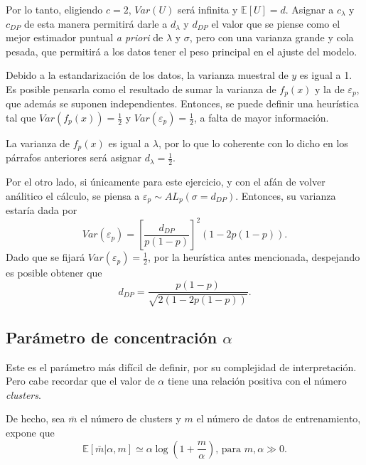 Por lo tanto, eligiendo $c = 2$, $Var(U)$ ser\'a infinita y $\mathbb{E}[U] = d$. Asignar a $c_\lambda$ y $c_{DP}$ de esta manera permitir\'a darle a $d_\lambda$ y $d_{DP}$ el valor que se piense como el mejor estimador puntual \textit{a priori} de $\lambda$ y $\sigma$, pero con una varianza grande y cola pesada, que permitir\'a a los datos tener el peso principal en el ajuste del modelo. 

Debido a la estandarizaci\'on de los datos, la varianza muestral de $y$ es igual a 1. Es posible pensarla como el resultado de sumar la varianza de $f_p(x)$ y la de $\varepsilon_p$, que adem\'as se suponen independientes. Entonces, se puede definir una heur\'istica tal que $Var(f_p(x)) = \frac{1}{2}$ y $Var(\varepsilon_p) = \frac{1}{2}$, a falta de mayor informaci\'on.

La varianza de $f_p(x)$ es igual a $\lambda$, por lo que lo coherente con lo dicho en los p\'arrafos anteriores ser\'a asignar $d_\lambda = \frac{1}{2}$. 

Por el otro lado, si \'unicamente para este ejercicio, y con el af\'an de volver an\'alitico el c\'alculo, se piensa a $\varepsilon_p \sim AL_p(\sigma = d_{DP})$. Entonces, su varianza estar\'ia dada por
\begin{equation*}
    Var(\varepsilon_p) = 
    \left[\frac{d_{DP}}{p(1-p)}\right]^2
    (1-2p(1-p)).
\end{equation*}
Dado que se fijar\'a $Var(\varepsilon_p) = \frac{1}{2}$, por la heur\'istica antes mencionada, despejando es posible obtener que
\begin{equation*}
    d_{DP} = \frac{p(1-p)}{\sqrt{2(1-2p(1-p))}}.
\end{equation*}

\subsection{Par\'ametro de concentraci\'on $\alpha$}

Este es el par\'ametro m\'as dif\'icil de definir, por su complejidad de interpretaci\'on. Pero cabe recordar que el valor de $\alpha$ tiene una relaci\'on positiva con el n\'umero \textit{clusters}. 

De hecho, sea $\bar{m}$ el n\'umero de clusters y $m$ el n\'umero de datos de entrenamiento, \cite{Yee_DirProc} expone que
\begin{equation*}
    \mathbb{E}[\bar{m}|\alpha, m] 
    \simeq 
    \alpha
    \log 
    \left(
        1 + \frac{m}{\alpha}
    \right)
    \text{, para } m, \alpha \gg 0.
\end{equation*}

